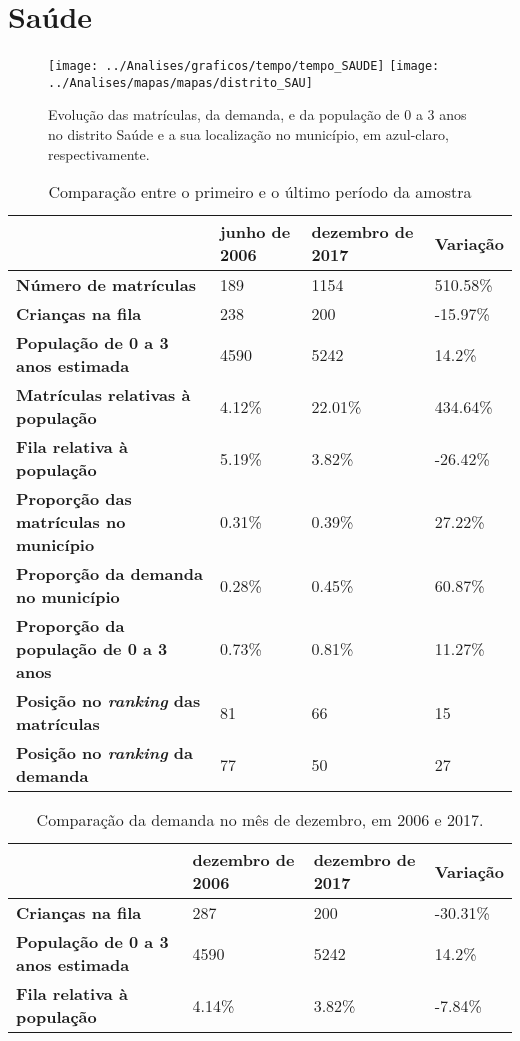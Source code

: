 \section{Saúde}
\begin{figure}[H]
\centering
\texttt{[image: ../Analises/graficos/tempo/tempo\_SAUDE]}
\texttt{[image: ../Analises/mapas/mapas/distrito\_SAU]}
\caption{Evolução das matrículas, da demanda, e da população de 0 a 3 anos no distrito Saúde e a sua localização no município, em azul-claro, respectivamente.}
\end{figure}
\begin{table}[H]
\begin{tabular}{l|l|l|l}
\textbf{}                                      & \textbf{junho de 2006}       & \textbf{dezembro de 2017}    & \textbf{Variação} \\ \hline
\textbf{Número de matrículas}                  & 189 & 1154 & 510.58\% \\ \hline
\textbf{Crianças na fila}                      & 238 & 200 & -15.97\% \\ \hline
\textbf{População de 0 a 3 anos estimada}      & 4590 & 5242 & 14.2\% \\ \hline
\textbf{Matrículas relativas à população}      & 4.12\% & 22.01\% & 434.64\% \\ \hline
\textbf{Fila relativa à população}             & 5.19\% & 3.82\% & -26.42\% \\ \hline
\textbf{Proporção das matrículas no município} & 0.31\% & 0.39\% & 27.22\% \\ \hline
\textbf{Proporção da demanda no município}     & 0.28\% & 0.45\% & 60.87\% \\ \hline
\textbf{Proporção da população de 0 a 3 anos}  & 0.73\% & 0.81\% & 11.27\% \\ \hline
\textbf{Posição no \textit{ranking} das matrículas}     & 81 & 66 & 15 \\ \hline
\textbf{Posição no \textit{ranking} da demanda}         & 77 & 50 & 27 \\ 
\end{tabular}
\caption{Comparação entre o primeiro e o último período da amostra}
\end{table}
\begin{table}[H]
\begin{tabular}{l|l|l|l}
\textbf{}                                 & \textbf{dezembro de 2006} & \textbf{dezembro de 2017} & \textbf{Variação} \\ \hline
\textbf{Crianças na fila}                      & 287 & 200 & -30.31\% \\ \hline
\textbf{População de 0 a 3 anos estimada}      & 4590 & 5242 & 14.2\% \\ \hline
\textbf{Fila relativa à população}             & 4.14\% & 3.82\% & -7.84\% \\
\end{tabular}
\caption{Comparação da demanda no mês de dezembro, em 2006 e 2017.}
\end{table}
